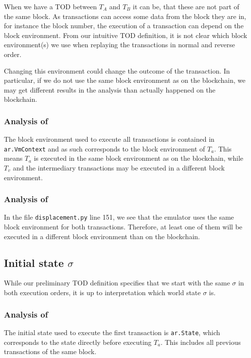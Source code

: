 \documentclass[draft,final]{vutinfth} %
\begin{document}
When we have a TOD between $T_A$ and $T_B$ it can be, that these are not part of the same block. As transactions can access some data from the block they are in, for instance the block number, the execution of a transaction can depend on the block environment. From our intuitive TOD definition, it is not clear which block environment(s) we use when replaying the transactions in normal and reverse order.

Changing this environment could change the outcome of the transaction. In particular, if we do not use the same block environment as on the blockchain, we may get different results in the analysis than actually happened on the blockchain.

\subsubsection{Analysis of \cite{zhang_combatting_2023}}

The block environment used to execute all transactions is contained in \verb|ar.VmContext| and as such corresponds to the block environment of $T_a$. This means $T_a$ is executed in the same block environment as on the blockchain, while $T_v$ and the intermediary transactions may be executed in a different block environment.

\subsubsection{Analysis of \cite{torres_frontrunner_2021}}

In the file \verb|displacement.py| line 151, we see that the emulator uses the same block environment for both transactions. Therefore, at least one of them will be executed in a different block environment than on the blockchain.

\subsection{Initial state $\sigma$}

While our preliminary TOD definition specifies that we start with the same $\sigma$ in both execution orders, it is up to interpretation which world state $\sigma$ is.

\subsubsection{Analysis of \cite{zhang_combatting_2023}}

The initial state used to execute the first transaction is \verb|ar.State|, which corresponds to the state directly before executing $T_a$. This includes all previous transactions of the same block.
\end{document}
